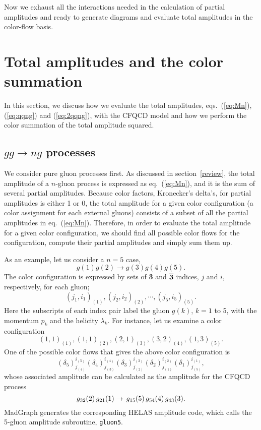 Now we exhaust all the interactions needed in
the calculation of partial amplitudes and ready to generate diagrams and evaluate total
amplitudes in the color-flow
basis.

\section{Total amplitudes and the color summation}
\label{total}
In this section, we discuss how we evaluate the total amplitudes,
eqs.~(\ref{eq:Mn}), (\ref{eq:qqng}) and (\ref{eq:2qqng}), with the
CFQCD model and how we perform the color summation of the total
amplitude squared.

\subsection{$gg\rightarrow ng$ processes}
\label{gg}
 We consider pure gluon processes first. As discussed in section~\ref{review}, the total amplitude of a $n$-gluon process is expressed as
eq.~(\ref{eq:Mn}), and it is the sum of several partial
amplitudes. Because color factors, Kronecker's delta's, for partial
amplitudes is either 1 or 0, the total amplitude for a given color
configuration (a color assignment for each external gluons) consists of a subset of all the partial amplitudes in
eq.~(\ref{eq:Mn}).  Therefore, in order to evaluate the total amplitude for a given
color configuration, we should find all possible color flows for the
configuration, compute their partial amplitudes and simply sum
them up.

As an example, let us consider a $n=5$ case,
\begin{equation}
g(1)g(2)\rightarrow g(3)g(4)g(5).
\end{equation}
 The color configuration is expressed by sets of {\bf 3} and
$\overline{\bf 3}$ indices, $j$ and $i$, respectively, for each gluon;
\begin{equation}
(j_1,i_1)_{(1)}, (j_2,i_2)_{(2)}, \cdots, (j_5,i_5)_{(5)}.
\end{equation}
Here the subscripts of each index pair label the gluon $g(k)$, $k=1$ to 5,
with the momentum $p_k$ and the helicity $\lambda_k$. For instance, let us
examine a color
configuration
\begin{equation}
(1,1)_{(1)}, (1,1)_{(2)},(2,1)_{(3)},(3,2)_{(4)},(1,3)_{(5)}.
\label{eq:colorconfig}
\end{equation}
  One of the possible color flows that gives the above color
  configuration is
\begin{equation}
(\delta_5)^{i_{(5)}}_{j_{(4)}}(\delta_4)^{i_{(4)}}_{j_{(3)}}(\delta_3)^{i_{(3)}}_{j_{(2)}}(\delta_2)^{i_{(2)}}_{j_{(1)}}(\delta_1)^{i_{(1)}}_{j_{(5)}},
\label{eq:cf1}
\end{equation}
 whose associated amplitude can be calculated as the amplitude for the
 CFQCD process\\
\begin{equation}
 g_{32}(2)\,g_{21}(1)\rightarrow \,g_{15}(5) \,g_{54}(4) \,g_{43}(3). \\
\end{equation}
MadGraph generates the corresponding HELAS amplitude code, which calls the
5-gluon amplitude subroutine, {\tt gluon5}.

